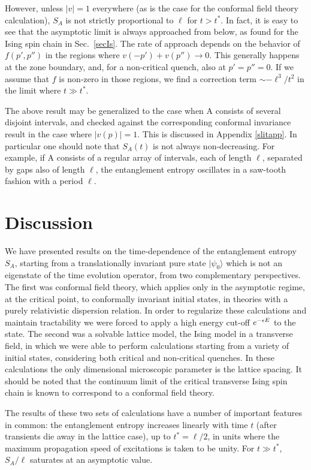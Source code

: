 However, unless $|v|=1$ everywhere (as is the case for the conformal
field theory calculation), $S_A$ is not strictly proportional
to $\ell$ for $t>t^*$. In fact, it is easy to see that the asymptotic
limit is always approached from below, as found for the Ising spin chain
in Sec.~\ref{secIs}. The rate of approach depends on the behavior of
$f(p',p'')$ in the regions where $v(-p')+v(p'')\to 0$. This generally
happens at the zone boundary, and, for a non-critical quench, also at 
$p'=p''=0$. If we assume that $f$ is non-zero in those regions, we find
a correction term $\sim -\ell^3/t^2$ in the limit where $t\gg t^*$. 

The above result may be generalized to the case when A consists of
several disjoint intervals, and checked against the corresponding
conformal invariance result in the case where $|v(p)|=1$. 
This is discussed in
Appendix \ref{slitapp}. In particular one should note that $S_A(t)$ is not
always non-decreasing. For example, if A consists of a regular
array of intervals, each of length $\ell$, separated by gaps also
of length $\ell$, the entanglement entropy oscillates in a
saw-tooth fashion with a period $\ell$.



\section{Discussion}
\label{disc}

We have presented results on the time-dependence of the entanglement
entropy $S_A$, 
starting from a translationally invariant pure state $|\psi_0\rangle$
which is
not an eigenstate of the time evolution operator, from two complementary
perspectives. The first was conformal field theory, which applies only
in the asymptotic regime, at the critical point, to conformally
invariant initial states, in theories with a
purely relativistic dispersion relation. In order to regularize these
calculations and maintain tractability we were forced to apply a
high energy cut-off $e^{-\epsilon E}$ to the state. The second was a solvable
lattice model, the Ising model in a transverse field, in which we were
able to perform calculations starting from a variety of initial
states, considering both critical and non-critical quenches. In these
calculations the only dimensional microscopic parameter is the lattice
spacing. It should be noted that the continuum limit of the critical
transverse Ising spin chain is known to correspond to a conformal
field theory.

The results of these two sets of calculations have a number of important
features in common: the entanglement entropy increases linearly with
time $t$ (after transients die away in the lattice case), up to
$t^*=\ell/2$, in units where the maximum propagation speed of excitations
is taken to be unity. For $t\gg t^*$, $S_A/\ell$ saturates at an
asymptotic value. 

